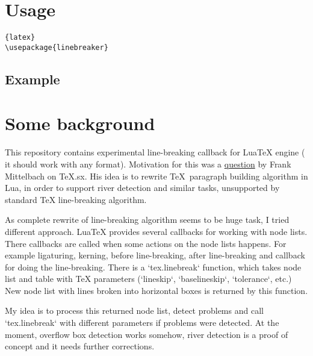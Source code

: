 \documentclass{ltxdoc}
\begin{document}
\section{Usage}


\begin{lstlisting}{latex}
\usepackage{linebreaker}
\end{lstlisting}


\subsection{Example}


\section{Some background}

This repository contains experimental line-breaking callback for LuaTeX engine (
it should work with any format). Motivation for this was a
\href{http://tex.stackexchange.com/q/200989/2891}{question} by Frank Mittelbach on
TeX.sx. His idea is to rewrite \TeX\ paragraph building algorithm in Lua, in
order to support river detection and similar tasks, unsupported by standard TeX
line-breaking algorithm.

As complete rewrite of line-breaking algorithm seems to be huge task, I tried
different approach. LuaTeX provides several callbacks for working with node lists. 
There callbacks are called when some actions on the node lists happens. For
example ligaturing, kerning, before line-breaking, after line-breaking and
callback for doing the line-breaking. There is a `tex.linebreak` function, which takes
node list and table with TeX parameters (`lineskip`, `baselineskip`, `tolerance`,
etc.) New node list with lines broken into horizontal boxes is returned by this
function.

My idea is to process this returned node list, detect problems and call
`tex.linebreak` with different parameters if problems were detected. At the
moment, overflow box detection works somehow, river detection is a proof of
concept and it needs further corrections.
\end{document}
